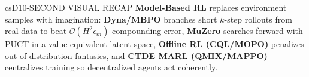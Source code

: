 \documentclass[../../../../master.tex]{subfiles}
\begin{document}
\begin{cscolumns}
\begin{cscard}{csD}{10-SECOND VISUAL RECAP}
  \sffamily\footnotesize
  \textbf{Model-Based RL} replaces environment samples with imagination: \textbf{Dyna/MBPO} branches short $k$-step rollouts from real data to beat $\mathcal{O}(H^2\epsilon_m)$ compounding error, \textbf{MuZero} searches forward with PUCT in a value-equivalent latent space, \textbf{Offline RL (CQL/MOPO)} penalizes out-of-distribution fantasies, and \textbf{CTDE MARL (QMIX/MAPPO)} centralizes training so decentralized agents act coherently.
\end{cscard}
\end{cscolumns}

\csend
\end{document}

